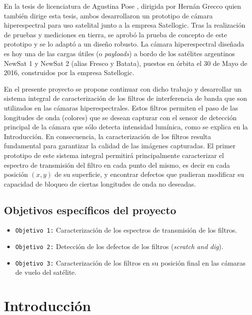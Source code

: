 \documentclass{ctuthesis}
\begin{document}
En la tesis de licenciatura de Agustina Pose \cite{Pose2017}, dirigida 
por 
Hernán Grecco quien también dirige esta tesis, ambos desarrollaron un prototipo 
de cámara hiperespectral para uso satelital junto a la empresa Satellogic. Tras 
la realización de pruebas y mediciones en tierra, se aprobó la 
prueba de concepto de este prototipo y se lo adaptó a un diseño robusto. La 
cámara hiperespectral diseñada es hoy una de las cargas útiles (o 
\textit{payloads}) a bordo de los satélites argentinos NewSat 1 y NewSat 2 
(alias Fresco y Batata), puestos en órbita el 30 de Mayo de 2016, construidos 
por la empresa Satellogic.

En el presente proyecto se propone continuar con dicho trabajo y desarrollar un 
sistema integral de caracterización de los filtros de interferencia de banda 
que son utilizados en las cámaras hiperespectrales. Estos filtros permiten el 
paso de las longitudes de onda (colores) que se desean capturar con el sensor 
de detección principal de la cámara que sólo detecta intensidad lumínica, como 
se explica en la Introducción. En consecuencia, la caracterización de los 
filtros resulta fundamental para garantizar la calidad de las imágenes 
capturadas. El primer prototipo de este sistema integral permitirá 
principalmente caracterizar el espectro de transmisión del filtro en 
cada punto del mismo, es decir en cada posición $(x,y)$ de su superficie, y 
encontrar defectos que pudieran modificar su capacidad de bloqueo de ciertas 
longitudes de onda no deseadas.

\subsection*{Objetivos específicos del proyecto}
\begin{itemize}
	
	\item \texttt{Objetivo 1:} Caracterización de los espectros de transmisión 
	de los filtros.
	\item \texttt{Objetivo 2:} Detección de los defectos de los filtros 
	(\textit{scratch and dig}).
	\item \texttt{Objetivo 3:} Caracterización de los filtros en su posición 
	final en las cámaras de vuelo 
	del satélite. \end{itemize}
\section*{Introducción}
\end{document}
